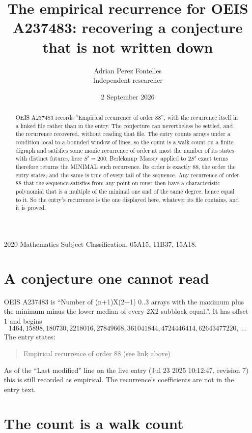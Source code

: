 \documentclass[11pt,a4paper]{article}
\title{The empirical recurrence for OEIS A237483: recovering a conjecture that is not written down}
\author{Adrian Perez Fontelles\\ \small Independent researcher}
\date{2 September 2026}
\theoremstyle{plain}
\theoremstyle{definition}
\begin{document}
\maketitle

\begin{abstract}
OEIS A237483 records ``Empirical recurrence of order $88$'', with the recurrence itself in a
linked file rather than in the entry. The conjecture can nevertheless be settled, and the
recurrence recovered, without reading that file. The entry counts arrays under a condition
local to a bounded window of lines, so the count is a walk count on a finite digraph and
satisfies some monic recurrence of order at most the number of its states with distinct
futures, here $S'=200$; Berlekamp--Massey applied to $2S'$ exact
terms therefore returns the MINIMAL such recurrence. Its order is exactly $88$, the order
the entry states, and the same is true of every tail of the sequence. Any recurrence of order
$88$ that the sequence satisfies from any point on must then have a characteristic
polynomial that is a multiple of the minimal one and of the same degree, hence equal to it. So
the entry's recurrence is the one displayed here, whatever its file contains, and it is
proved.
\end{abstract}

\noindent\small 2020 Mathematics Subject Classification. 05A15, 11B37, 15A18.\normalsize

\section{A conjecture one cannot read}

OEIS A237483 is ``Number of (n+1)X(2+1) 0..3 arrays with the maximum plus the minimum minus the lower median of every 2X2 subblock equal.''. It has offset $1$ and begins
\[
1464, 15898, 180730, 2218016, 27849668, 361041844, 4724446414, 62643477220,\ \dots
\]
The entry states:
\begin{quote}
Empirical recurrence of order 88 (see link above)
\end{quote}
As of the ``Last modified'' line on the live entry (Jul 23 2025 10:12:47, revision 7) this is still
recorded as empirical. The recurrence's coefficients are not in the entry text.

\section{The count is a walk count}
\end{document}
